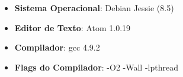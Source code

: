\begin{itemize}
	\item{\textbf{Sistema Operacional}: Debian Jessie (8.5)}
	\item{\textbf{Editor de Texto}: Atom 1.0.19}
	\item{\textbf{Compilador}: gcc 4.9.2}
	\item{\textbf{Flags do Compilador}: -O2 -Wall -lpthread}
\end{itemize}
